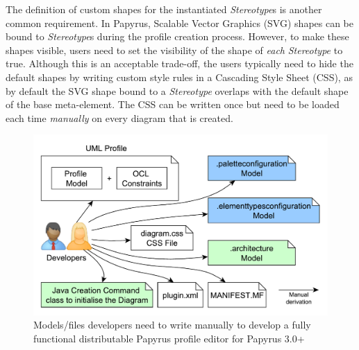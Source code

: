 The definition of custom shapes for the instantiated \textit{Stereotype}s is another common requirement. 
In Papyrus, Scalable Vector Graphics (SVG) shapes can be bound to \textit{Stereotype}s during the profile creation process. 
However, to make these shapes visible, users need to set the visibility of the shape of \textit{each} \textit{Stereotype} to true. 
Although this is an acceptable trade-off, the users typically need to hide the default shapes by writing custom style rules in a Cascading Style Sheet (CSS), as by default the SVG shape bound to a \textit{Stereotype} overlaps with the default shape of the base meta-element.
The CSS can be written once but need to be loaded each time \textit{manually} on every diagram that is created. 

\begin{figure}[ht!]
	\centering
	\includegraphics[width=1\textwidth]{diagrams/neededPapyrusFiles_new.pdf}
	\vspace{-3mm}
	\caption[]{Models/files developers need to write manually to 
		develop a fully functional distributable Papyrus profile editor for Papyrus 3.0+}
	\label{fig:neededPapyrusFiles_new}

\end{figure}

